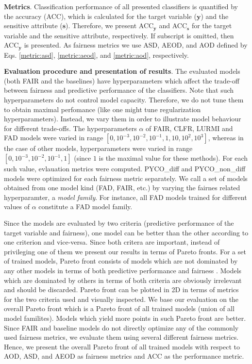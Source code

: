 \documentclass[preprint,12pt]{elsarticle}
\begin{document}
\textbf{Metrics}.
Classification performance of all presented classifiers is quantified by the accuracy (ACC), which is calculated for the target variable ($\mathbf{y}$) and the sensitive attribute ($\mathbf{s}$). Therefore, we present ACC$_\mathbf{y}$ and ACC$_\mathbf{s}$ for the target variable and the sensitive attribute, respectively. If subscript is omitted, then ACC$_\mathbf{y}$ is presented. As fairness metrics we use ASD, AEOD, and AOD defined by Eqs. \ref{metric:asd}, \ref{metric:aeod}, and \ref{metric:aod}, respectively. 

\textbf{Evaluation procedure and presentation of results}. The evaluated models (both FAIR and the baselines) have hyperparameters which affect the trade-off between fairness and predictive performance of the classifiers. Note that such hyperparameters do not control model capacity. Therefore, we do not tune them to obtain maximal perfomance (like one might tune regularization hyperparameters). Instead, we vary them in order to illustrate model behaviour for different trade-offs. The hyperparameters $\alpha$ of FAIR, CLFR, LURMI and FAD models were varied in range $[0, 10^{-3}, 10^{-2}, 10^{-1}, 1, 10, 10^{2}, 10^{3}]$, whereas in the case of other models, hyperparameters were varied in range $[0, 10^{-3}, 10^{-2}, 10^{-1}, 1]$ (since $1$ is the maximal value for these methods). For each such value, evlauation metrics were computed. PYCO\_diff and PYCO\_non\_diff models were optimized for each fairness metric separately. We call a set of models obtained from one model kind (FAD, FAIR, etc.) by varying the fairnes related hyperparamter, a {\em model family}. For instance, all FAD models trained for different values of $\alpha$ constitute a FAD model family.

Since the models are evaluated by two criteria (predictive performance of the target variable and fairness), one model can be better than the other according to one criterion and vice-versa. Since both critera are important, instead of privileging one of them we present our results in terms of Pareto fronts. For a set of trained models, Pareto front consists of models which are not dominated by any other models in terms of both predictive performance and fairness \cite{marler2004survey}. Models which are dominated by others in terms of both criteria are obviously irrelevant and should be discarded. Pareto front can be plotted in 2D in terms of metrics for the two criteria used and visually inspected. We base our evaluation on the overall Pareto front which is a Pareto front of all trained models (union of all model familites). Models which yield more points in such Pareto front are better.
Since FAIR and baseline models do not directly optimize any of the commonly used fairness metrics, we evaluate them using several different fairness metrics. Hence, we present the overall Pareto front of all trained models with respect to AOD, ASD, and AEOD as fairness metrics and ACC as the performance metric.
\end{document}

